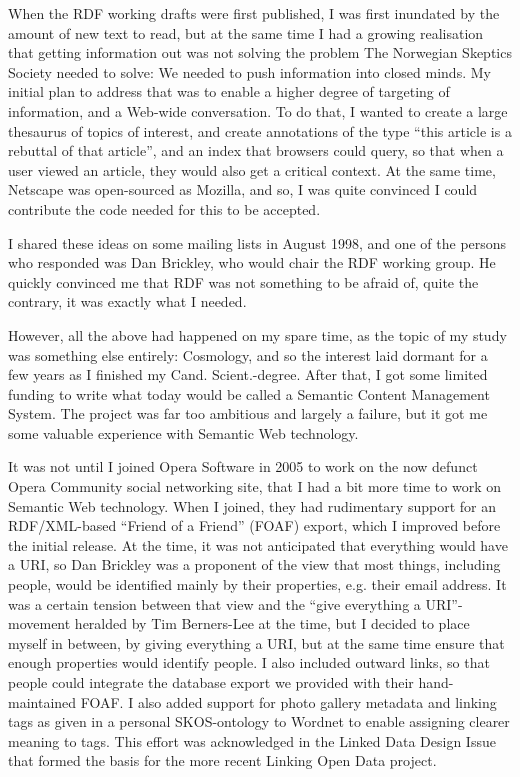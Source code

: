 {When the RDF working drafts were first published, I was first
inundated by the amount of new text to read, but at the same time I
had a growing realisation that getting information out was not solving
the problem The Norwegian Skeptics Society needed to solve: We needed
to push information into closed minds. My initial plan to address that
was to enable a higher degree of targeting of information, and a Web-wide
conversation. To do that, I wanted to create a large thesaurus of
topics of interest, and create annotations of the type ``this article
is a rebuttal of that article'', and an index that browsers could
query, so that when a user viewed an article, they would also get a
critical context. At the same time, Netscape was open-sourced as
Mozilla, and so, I was quite convinced I could contribute the code
needed for this to be accepted. 

I shared these ideas on some mailing lists in August 1998, and one of
the persons who responded was Dan Brickley, who would chair the RDF
working group. He quickly convinced me that RDF was not something to
be afraid of, quite the contrary, it was exactly what I needed.

However, all the above had happened on my spare time, as the topic of
my study was something else entirely: Cosmology, and so the interest
laid dormant for a few years as I finished my Cand. Scient.-degree. 
After that, I got some limited funding to write what today would be
called a Semantic Content Management System. The project was far too
ambitious and largely a failure, but it got me some valuable
experience with Semantic Web technology.

It was not until I joined Opera Software in 2005 to work on the now
defunct Opera Community social networking site, that I had a bit more
time to work on Semantic Web technology. When I joined, they had
rudimentary support for an RDF/XML-based ``Friend of a Friend'' (FOAF)
export, which I improved before the initial release. At the time, it
was not anticipated that everything would have a URI, so Dan Brickley
was a proponent of the view that most things, including people, would
be identified mainly by their properties, e.g. their email address. It
was a certain tension between that view and the ``give everything a
URI''-movement heralded by Tim Berners-Lee at the time, but I decided
to place myself in between, by giving everything a URI, but at the
same time ensure that enough properties would identify people. I also
included outward links, so that people could integrate the database
export we provided with their hand-maintained FOAF. I also added
support for photo gallery metadata and linking tags as given in a
personal SKOS-ontology to Wordnet to enable assigning clearer meaning
to tags. This effort was acknowledged in the Linked Data Design
Issue\cite{TODO} that formed the basis for the more recent Linking
Open Data project.

}
